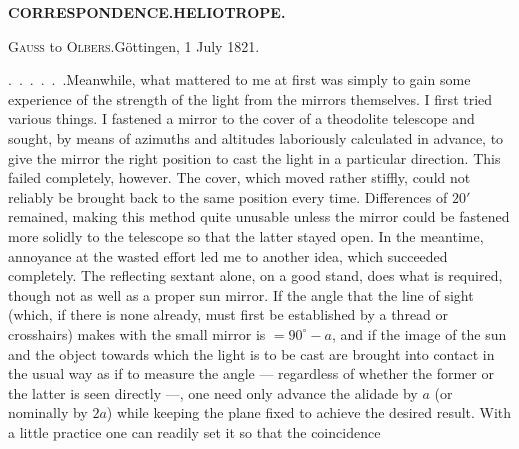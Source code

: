 \par\clearpage
\noindent\null\hfill{\small\textbf{CORRESPONDENCE.\quad HELIOTROPE.}}\hfill{}\par
\vspace*{4.2cm}
\begin{center}{\fontsize{19}{24}\selectfont{}}\end{center}
\vspace*{1.5cm}
\begin{center}{\large\textsc{Gauss} to \textsc{Olbers}.\quad Göttingen, 1 July 1821.}\end{center}
\par\noindent\hspace*{\parindent}.\ .\ .\ .\ .\ .\enspace Meanwhile, what mattered to me at first was simply to gain some experience of the strength of the light from the mirrors themselves. I first tried various things. I fastened a mirror to the cover of a theodolite telescope and sought, by means of azimuths and altitudes laboriously calculated in advance, to give the mirror the right position to cast the light in a particular direction. This failed completely, however. The cover, which moved rather stiffly, could not reliably be brought back to the same position every time. Differences of $20'$ remained, making this method quite unusable unless the mirror could be fastened more solidly to the telescope so that the latter stayed open. In the meantime, annoyance at the wasted effort led me to another idea, which succeeded completely. The reflecting sextant alone, on a good stand, does what is required, though not as well as a proper sun mirror. If the angle that the line of sight (which, if there is none already, must first be established by a thread or crosshairs) makes with the small mirror is $=90^\circ-a$, and if the image of the sun and the object towards which the light is to be cast are brought into contact in the usual way as if to measure the angle --- regardless of whether the former or the latter is seen directly ---, one need only advance the alidade by $a$ (or nominally by $2a$) while keeping the plane fixed to achieve the desired result. With a little practice one can readily set it so that the coincidence
\par\medskip\noindent\makebox[.86\linewidth][r]{59\textsuperscript{*}}\par
